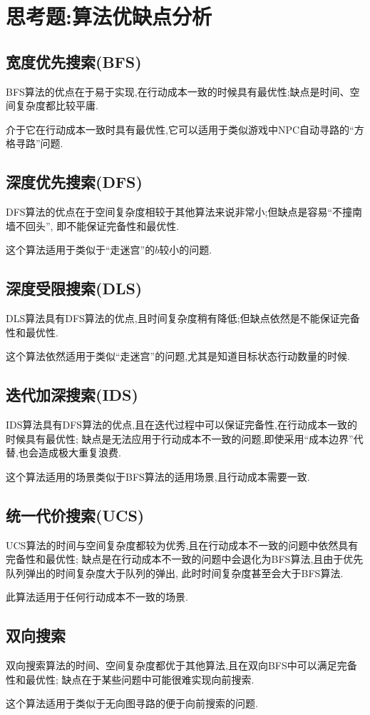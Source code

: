     \section{思考题:算法优缺点分析}

    \subsection{宽度优先搜索(BFS)}
    
    BFS算法的优点在于易于实现,在行动成本一致的时候具有最优性;缺点是时间、空间复杂度都比较平庸.
    
    介于它在行动成本一致时具有最优性,它可以适用于类似游戏中NPC自动寻路的``方格寻路''问题.

    \subsection{深度优先搜索(DFS)}
    
    DFS算法的优点在于空间复杂度相较于其他算法来说非常小;但缺点是容易``不撞南墙不回头'',
    即不能保证完备性和最优性.
    
    这个算法适用于类似于``走迷宫''的\(b\)较小的问题.

    \subsection{深度受限搜索(DLS)}

    DLS算法具有DFS算法的优点,且时间复杂度稍有降低;但缺点依然是不能保证完备性和最优性.
    
    这个算法依然适用于类似``走迷宫''的问题,尤其是知道目标状态行动数量的时候.

    \subsection{迭代加深搜索(IDS)}

    IDS算法具有DFS算法的优点,且在迭代过程中可以保证完备性,在行动成本一致的时候具有最优性;
    缺点是无法应用于行动成本不一致的问题,即使采用``成本边界''代替,也会造成极大重复浪费.
    
    这个算法适用的场景类似于BFS算法的适用场景,且行动成本需要一致.

    \subsection{统一代价搜索(UCS)}

    UCS算法的时间与空间复杂度都较为优秀,且在行动成本不一致的问题中依然具有完备性和最优性;
    缺点是在行动成本不一致的问题中会退化为BFS算法,且由于优先队列弹出的时间复杂度大于队列的弹出,
    此时时间复杂度甚至会大于BFS算法.
    
    此算法适用于任何行动成本不一致的场景.

    \subsection{双向搜索}

    双向搜索算法的时间、空间复杂度都优于其他算法,且在双向BFS中可以满足完备性和最优性;
    缺点在于某些问题中可能很难实现向前搜索.
    
    这个算法适用于类似于无向图寻路的便于向前搜索的问题.



